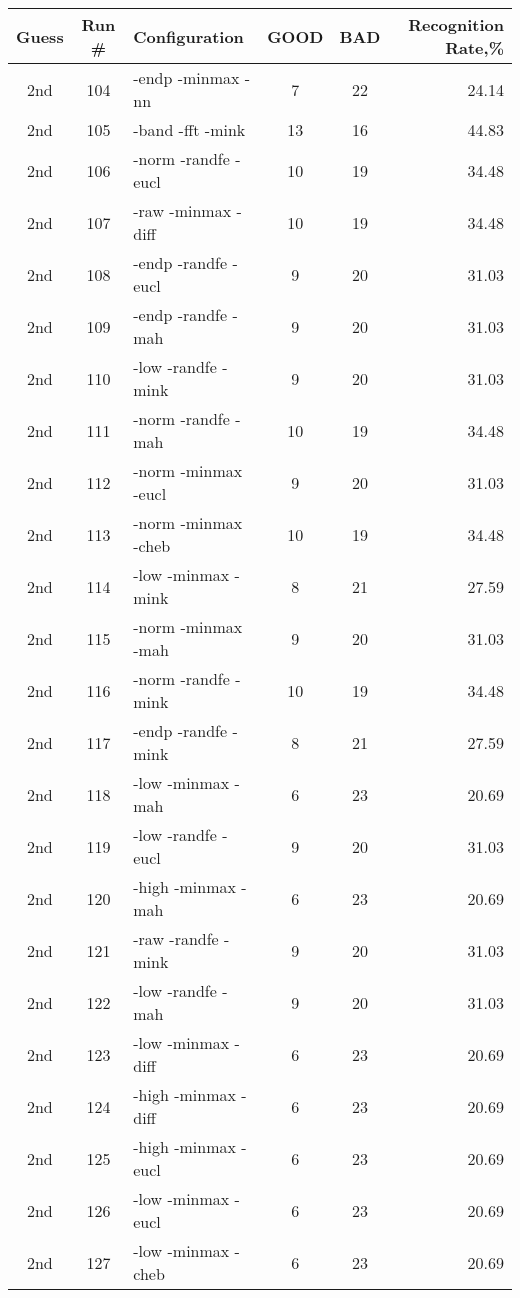 \begin{table}
\begin{minipage}[b]{\textwidth}
\centering
\begin{tabular}{|c|c|l|c|c|r|} \hline
Guess & Run \# & Configuration & GOOD & BAD & Recognition Rate,\%\\ \hline\hline
2nd & 104 & -endp -minmax -nn  & 7 & 22 & 24.14\\ \hline
2nd & 105 & -band -fft -mink  & 13 & 16 & 44.83\\ \hline
2nd & 106 & -norm -randfe -eucl  & 10 & 19 & 34.48\\ \hline
2nd & 107 & -raw -minmax -diff  & 10 & 19 & 34.48\\ \hline
2nd & 108 & -endp -randfe -eucl  & 9 & 20 & 31.03\\ \hline
2nd & 109 & -endp -randfe -mah  & 9 & 20 & 31.03\\ \hline
2nd & 110 & -low -randfe -mink  & 9 & 20 & 31.03\\ \hline
2nd & 111 & -norm -randfe -mah  & 10 & 19 & 34.48\\ \hline
2nd & 112 & -norm -minmax -eucl  & 9 & 20 & 31.03\\ \hline
2nd & 113 & -norm -minmax -cheb  & 10 & 19 & 34.48\\ \hline
2nd & 114 & -low -minmax -mink  & 8 & 21 & 27.59\\ \hline
2nd & 115 & -norm -minmax -mah  & 9 & 20 & 31.03\\ \hline
2nd & 116 & -norm -randfe -mink  & 10 & 19 & 34.48\\ \hline
2nd & 117 & -endp -randfe -mink  & 8 & 21 & 27.59\\ \hline
2nd & 118 & -low -minmax -mah  & 6 & 23 & 20.69\\ \hline
2nd & 119 & -low -randfe -eucl  & 9 & 20 & 31.03\\ \hline
2nd & 120 & -high -minmax -mah  & 6 & 23 & 20.69\\ \hline
2nd & 121 & -raw -randfe -mink  & 9 & 20 & 31.03\\ \hline
2nd & 122 & -low -randfe -mah  & 9 & 20 & 31.03\\ \hline
2nd & 123 & -low -minmax -diff  & 6 & 23 & 20.69\\ \hline
2nd & 124 & -high -minmax -diff  & 6 & 23 & 20.69\\ \hline
2nd & 125 & -high -minmax -eucl  & 6 & 23 & 20.69\\ \hline
2nd & 126 & -low -minmax -eucl  & 6 & 23 & 20.69\\ \hline
2nd & 127 & -low -minmax -cheb  & 6 & 23 & 20.69\\ \hline

\end{tabular}
\end{minipage}
\end{table}
